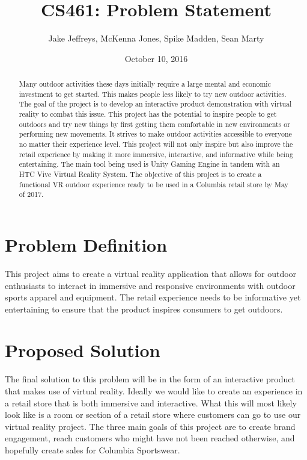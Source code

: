 \documentclass[10pt, oneside,onecolumn,draftclsnofoot]{IEEEtran}
\title{CS461: Problem Statement}
\author{Jake Jeffreys, McKenna Jones, Spike Madden, Sean Marty}
\date{October 10, 2016}
\begin{document}
\begin{titlepage}
\maketitle
\vspace{3cm}
\begin{abstract}
Many outdoor activities these days initially require a large mental and economic
investment to get started. This makes people less likely to try new outdoor
activities. The goal of the project is to develop an interactive product
demonstration with virtual reality to combat this issue. This project has the
potential to inspire people to get outdoors and try new things by first getting
them comfortable in new environments or performing new movements. It strives to
make outdoor activities accessible to everyone no matter their experience level.
This project will not only inspire but also improve the retail experience by
making it more immersive, interactive, and informative while being
entertaining. The main tool being used is Unity Gaming Engine in tandem with an
HTC Vive Virtual Reality System. The objective of this project is to create a
functional VR outdoor experience ready to be used in a Columbia retail store by
May of 2017.
\end{abstract}
\end{titlepage}

\section{Problem Definition}
This project aims to create a virtual reality application that allows for
outdoor enthusiasts to interact in immersive and responsive environments with
outdoor sports apparel and equipment. The retail experience needs to be
informative yet entertaining to ensure that the product inspires consumers to
get outdoors.


\section{Proposed Solution}

The final solution to this problem will be in the form of an interactive
product that makes use of virtual reality. Ideally we would like to create an
experience in a retail store that is both immersive and interactive. What this
will most likely look like is a room or section of a retail store where
customers can go to use our virtual reality project. The three main goals of
this project are to create brand engagement, reach customers who might have not
been reached otherwise, and hopefully create sales for Columbia Sportswear.
\end{document}
